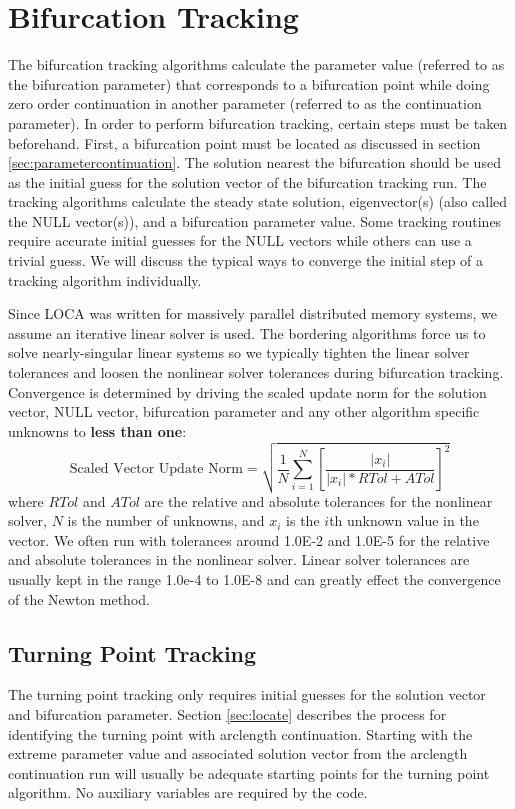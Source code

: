 \section{Bifurcation Tracking} \label{sec:track}
The bifurcation tracking algorithms calculate the parameter value (referred to as the bifurcation parameter) that corresponds to a bifurcation point while doing zero order continuation in another parameter (referred to as the continuation parameter).  In order to perform bifurcation tracking, certain steps must be taken beforehand.  First, a bifurcation point must be located as discussed in section \ref{sec:parametercontinuation}.  The solution nearest the bifurcation should be used as the initial guess for the solution vector of the bifurcation tracking run.  The tracking algorithms calculate the steady state solution, eigenvector(s) (also called the NULL vector(s)), and a bifurcation parameter value.  Some tracking routines require accurate initial guesses for the NULL vectors while others can use a trivial guess.  We will discuss the typical ways to converge the initial step of a tracking algorithm individually.

Since LOCA was written for massively parallel distributed memory systems, we assume an iterative linear solver is used.  The bordering algorithms force us to solve nearly-singular linear systems so we typically tighten the linear solver tolerances and loosen the nonlinear solver tolerances during bifurcation tracking. Convergence is determined by driving the scaled update norm for the solution vector, NULL vector, bifurcation parameter and any other algorithm specific unknowns to \textbf{less than one}:
\begin{equation}
\mbox{Scaled Vector Update Norm} = \sqrt{\frac{1}{N}\sum_{i=1}^{N}\left[ \frac{|x_i|}{|x_i|*RTol + ATol} \right]^2}
\label{eqn:convergence}
\end{equation}
where $RTol$ and $ATol$ are the relative and absolute tolerances for the nonlinear solver, $N$ is the number of unknowns, and $x_i$ is the $i$th unknown value in the vector.  We often run with tolerances around 1.0E-2 and 1.0E-5 for the relative and absolute tolerances in the nonlinear solver.  Linear solver tolerances are usually kept in the range 1.0e-4 to 1.0E-8 and can greatly effect the convergence of the Newton method.

\subsection{Turning Point Tracking} \label{sec:TPT}
The turning point tracking only requires initial guesses for the solution vector and bifurcation parameter. Section \ref{sec:locate} describes the process for identifying the turning point with arclength continuation. Starting with the extreme parameter value and associated solution vector from the arclength continuation run will usually be adequate starting points for the turning point algorithm. No auxiliary variables are required by the code.


